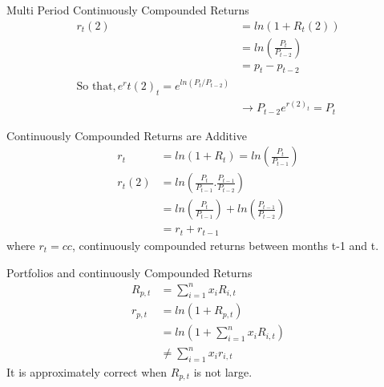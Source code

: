 \documentclass[14pt,xcolor=pdftex,dvipsnames,table]{beamer}
\begin{document}
\begin{frame}{Multi Period Continuously Compounded Returns}
\begin{align*}
r_t(2) &= ln(1 + R_t(2))\\
&= ln \left ( \frac{P_t}{P_{t-2}} \right ) \\
&=p_t - p_{t-2}\\
\text{So that}, e^rt(2)_t = e^{ln(P_t/P_{t-2})}\\
& \rightarrow P_{t-2}e^{r(2)_t} = P_t
\end{align*}
\end{frame}

\begin{frame}{Continuously Compounded Returns are Additive} 
\begin{align*}
r_t &= ln (1 + R_t) = ln \left ( \frac{P_t}{P_{t-1}} \right)\\
r_t(2) & = ln \left (\frac{P_t}{P_{t-1}}.\frac{P_{t-1}}{P_{t-2}} \right ) \\
& = ln \left ( \frac{P_t}{P_{t-1}} \right ) +  ln \left ( \frac{P_{t-1}}{P_{t-2}} \right ) \\
& = r_t + r_{t-1}
\end{align*}  
where $r_t = cc$, continuously compounded returns between months t-1 and t. 
\end{frame}

\begin{frame}{Portfolios and continuously Compounded Returns}
\begin{align*}
R_{p,t} & = \sum_{i = 1}^n x_iR_{i,t}\\
r_{p,t} & = ln(1 + R_{p,t})\\
& =ln(1 + \sum_{i = 1}^n x_iR_{i,t}) \\
& \neq \sum_{i = 1}^n x_ir_{i,t}
\end{align*}
It is approximately correct when $R_{p,t}$ is not large. 
\end{frame}
\end{document}
